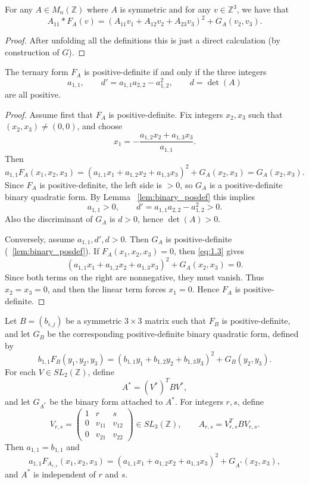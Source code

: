 \begin{lemma}
\label{lem:ternary_G_apply}
\leanok 
For any $A \in M_n(\mathbb{Z})$ where $A$ is symmetric and for any $v \in \mathbb{Z}^3$, we have
that 
\[
A_{11} * F_A(v) = (A_{11} v_1 + A_{12}v_2 + A_{23}v_3)^2 + G_A(v_2, v_3).
\]
\end{lemma}
\begin{proof}
\leanok
{}
After unfolding all the definitions this is just a direct calculation (by construction of $G$).
\end{proof}

\begin{lemma}
\label{lem:ternary_posdef_iff}
The ternary form $F_A$ is positive-definite if and only if the three integers
\[
a_{1,1},\qquad d' = a_{1,1}a_{2,2} - a_{1,2}^2,\qquad 
d = \det(A)
\]
are all positive.
\end{lemma}

\begin{proof}
\leanok
Assume first that $F_A$ is positive-definite.  
Fix integers $x_2, x_3$ such that $(x_2,x_3) \neq (0,0)$, and choose
\[
x_1 = -\frac{a_{1,2} x_2 + a_{1,3} x_3}{a_{1,1}}.
\]
Then
\[
a_{1,1} F_A(x_1, x_2, x_3)
= (a_{1,1}x_1 + a_{1,2}x_2 + a_{1,3}x_3)^2 + G_A(x_2,x_3)
= G_A(x_2,x_3).
\]
Since $F_A$ is positive-definite, the left side is $>0$, so $G_A$ is a positive‐definite
binary quadratic form. By Lemma ~\ref{lem:binary_posdef} this implies
\[
a_{1,1} > 0,\qquad d' = a_{1,1}a_{2,2} - a_{1,2}^2 > 0.
\]
Also the discriminant of $G_A$ is $d > 0$, hence $\det(A) > 0$.

Conversely, assume $a_{1,1}, d', d > 0$.  
Then $G_A$ is positive-definite (~\ref{lem:binary_posdef}).  
If $F_A(x_1,x_2,x_3) = 0$, then \eqref{eq:1.3} gives
\[
(a_{1,1}x_1 + a_{1,2}x_2 + a_{1,3}x_3)^2 + G_A(x_2,x_3) = 0.
\]
Since both terms on the right are nonnegative, they must vanish.  
Thus $x_2 = x_3 = 0$, and then the linear term forces $x_1 = 0$.  
Hence $F_A$ is positive-definite. 
\end{proof}

\begin{lemma}
\label{lem:ternary_lemma4}
\leanok
Let $B = (b_{i,j})$ be a symmetric $3\times 3$ matrix such that $F_B$ is
positive-definite, and let $G_B$ be the corresponding positive-definite binary quadratic form, defined by
\[
b_{1,1} F_B(y_1,y_2,y_3)
= (b_{1,1}y_1 + b_{1,2}y_2 + b_{1,3}y_3)^2 + G_B(y_2, y_3).
\]
For each $V \in SL_2(\mathbb{Z})$, define
\[
A^* = (V^*)^T B V^*,
\]
and let $G_{A^*}$ be the binary form attached to $A^*$.  
For integers $r,s$, define
\[
V_{r,s} =
\begin{pmatrix}
1 & r & s \\
0 & v_{11} & v_{12} \\
0 & v_{21} & v_{22}
\end{pmatrix}
\in SL_3(\mathbb{Z}),
\qquad
A_{r,s} = V_{r,s}^T B V_{r,s}.
\]
Then $a_{1,1} = b_{1,1}$ and
\[
a_{1,1} F_{A_{r,s}}(x_1,x_2,x_3)
= (a_{1,1}x_1 + a_{1,2}x_2 + a_{1,3}x_3)^2 + G_{A^*}(x_2,x_3),
\]
and $A^*$ is independent of $r$ and $s$.
\end{lemma}

